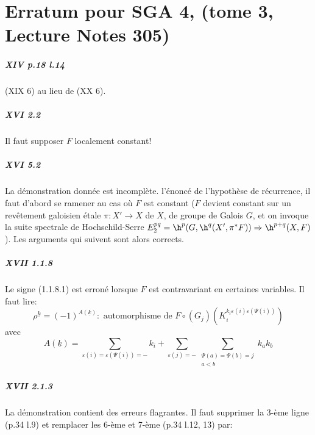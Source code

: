 
\appendix
{}\chapter{Erratum pour SGA 4, (tome 3, Lecture Notes 305)}

\paragraph{XIV p.18 l.14}
(XIX 6) au lieu de (XX 6). 

\paragraph{XVI 2.2}
Il faut supposer $F$ localement constant!

\paragraph{XVI 5.2}
La démonstration donnée est incomplète.  l'énoncé de 
l'hypothèse de récurrence, il faut d'abord se ramener au cas o\`u $F$ est 
constant ($F$ devient constant sur un rev\^etement galoisien étale 
$\pi:X'\to X$ de $X$, de groupe de Galois $G$, et on invoque la suite spectrale 
de Hochschild-Serre $E_2^{p q}=\h^p(G,\h^q(X',\pi^\ast F))\Rightarrow \h^{p+q}(X,F)$). 
Les arguments qui suivent sont alors corrects. 

\paragraph{XVII 1.1.8}
Le signe (1.1.8.1) est erroné lorsque $F$ est contravariant en certaines 
variables. Il faut lire: 
\begin{equation*}\tag{1.1.8.1}
  \rho^{\underline k} = (-1)^{A(\underline k)}: \text{ automorphisme de }
F\circ (G_j)\left(K_i^{k_i\varepsilon(i)\varepsilon(\Psi(i))}\right) 
\end{equation*}
avec 
\[
  A(\underline k) = \sum_{\varepsilon(i) = \varepsilon(\Psi(i))=-} k_i + \sum_{\varepsilon(j)=-} \sum_{\substack{\Psi(a)=\Psi(b)=j \\ a<b}} k_a k_b 
\]

\paragraph{XVII 2.1.3}
La démonstration contient des erreurs flagrantes. Il faut supprimer la 
3-ème ligne (p.34 l.9) et remplacer les 6-ème et 7-ème (p.34 l.12, 13) 
par: 

